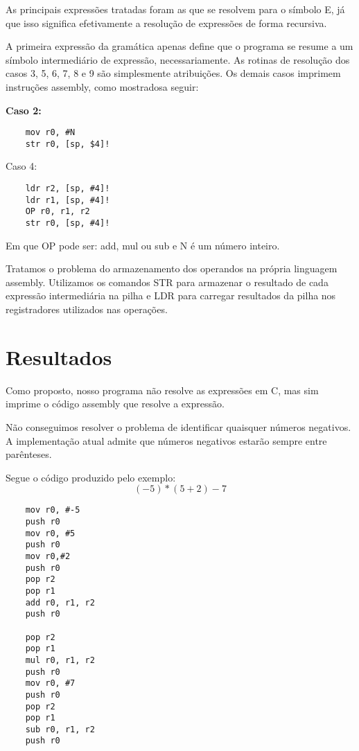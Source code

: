 \documentclass[a4paper, 11pt]{article}
\begin{document}
\begin{multicols*}{2}
\begin{multicols*}{2}
\end{multicols*}

As principais expressões tratadas foram as que se resolvem para o símbolo E, já que isso significa efetivamente a resolução de expressões de forma recursiva.

A primeira expressão da gramática apenas define que o programa se resume a um símbolo intermediário de expressão, necessariamente. As rotinas de resolução dos casos 3, 5, 6, 7, 8 e 9 são simplesmente atribuições. Os demais casos imprimem instruções assembly, como mostradosa seguir:

\begin{multicols*}{2}
\bf Caso 2:
\begin{verbatim}
    mov r0, #N
    str r0, [sp, $4]!
\end{verbatim}

\break
\vfill

Caso 4:
\begin{verbatim}
    ldr r2, [sp, #4]!
    ldr r1, [sp, #4]!
    OP r0, r1, r2
    str r0, [sp, #4]!
\end{verbatim}

\end{multicols*}

Em que OP pode ser: add, mul ou sub e N é um número inteiro.

Tratamos o problema do armazenamento dos operandos na própria linguagem assembly. Utilizamos os comandos STR para armazenar o resultado de cada expressão intermediária na pilha e LDR para carregar resultados da pilha nos registradores utilizados nas operações.

\section*{Resultados}

Como proposto, nosso programa não resolve as expressões em C, mas sim imprime o código assembly que resolve a expressão.

Não conseguimos resolver o problema de identificar quaisquer números negativos. A implementação atual admite que números negativos estarão sempre entre parênteses.

Segue o código produzido pelo exemplo: $$(-5)*(5 + 2) - 7$$

\begin{multicols*}{2}

\begin{verbatim}
    mov r0, #-5
    push r0
    mov r0, #5
    push r0
    mov r0,#2
    push r0
    pop r2
    pop r1
    add r0, r1, r2
    push r0

    pop r2
    pop r1
    mul r0, r1, r2
    push r0
    mov r0, #7
    push r0
    pop r2
    pop r1
    sub r0, r1, r2
    push r0
\end{verbatim}

\end{multicols*}

\end{multicols*}
\end{document}
